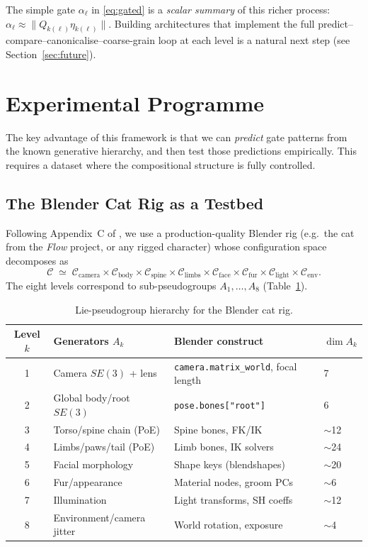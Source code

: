 \documentclass[11pt,a4paper]{article}
\newcommand{\cC}{\mathcal{C}}
\begin{document}
The simple gate $\alpha_\ell$ in \eqref{eq:gated} is a
\emph{scalar summary} of this richer process:
$\alpha_\ell\approx \|Q_{k(\ell)}\eta_{k(\ell)}\|$.
Building architectures that implement the full
predict--compare--canonicalise--coarse-grain loop
at each level is a natural next step
(see Section~\ref{sec:future}).


\section{Experimental Programme}\label{sec:experiments}

The key advantage of this framework is that we can
\emph{predict} gate patterns from the known generative hierarchy,
and then test those predictions empirically.
This requires a dataset where the compositional structure
is fully controlled.

\subsection{The Blender Cat Rig as a Testbed}\label{sec:blender}

Following Appendix~C of \citet{Ruffini2025compositional},
we use a production-quality Blender rig
(e.g.\ the cat from the \emph{Flow} project,
or any rigged character) whose configuration space decomposes as
\begin{equation}
  \cC \;\simeq\;
  \cC_{\text{camera}} \times
  \cC_{\text{body}} \times
  \cC_{\text{spine}} \times
  \cC_{\text{limbs}} \times
  \cC_{\text{face}} \times
  \cC_{\text{fur}} \times
  \cC_{\text{light}} \times
  \cC_{\text{env}}.
\end{equation}
The eight levels correspond to sub-pseudogroups $A_1,\ldots,A_8$
(Table~\ref{tab:levels}).

\begin{table}[h]
\centering
\caption{Lie-pseudogroup hierarchy for the Blender cat rig.}\label{tab:levels}
\smallskip
\begin{tabular}{@{}clll@{}}
\toprule
Level $k$ & Generators $A_k$ & Blender construct & $\dim A_k$ \\
\midrule
1 & Camera $SE(3)$ + lens & \texttt{camera.matrix\_world}, focal length & 7 \\
2 & Global body/root $SE(3)$ & \texttt{pose.bones["root"]} & 6 \\
3 & Torso/spine chain (PoE) & Spine bones, FK/IK & $\sim$12 \\
4 & Limbs/paws/tail (PoE) & Limb bones, IK solvers & $\sim$24 \\
5 & Facial morphology & Shape keys (blendshapes) & $\sim$20 \\
6 & Fur/appearance & Material nodes, groom PCs & $\sim$6 \\
7 & Illumination & Light transforms, SH coeffs & $\sim$12 \\
8 & Environment/camera jitter & World rotation, exposure & $\sim$4 \\
\bottomrule
\end{tabular}
\end{table}
\end{document}
